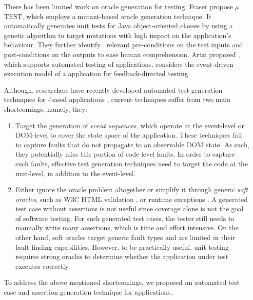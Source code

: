 There has been limited work on oracle generation for testing. 
Fraser \etal \cite{fraser:tse12} propose $\mu$TE\-ST, which employs a mutant-based oracle generation technique.  It automatically generates unit tests for Java object-oriented classes by using a genetic algorithm to target mutations with high impact on the application's behaviour. They further identify~\cite{fraser:issta11} relevant pre-conditions on the test inputs and post-conditions on the outputs to ease human comprehension.
Artzi \etal proposed \artemis \cite{artzi:icse11}, which supports automated testing of \javascript applications.
\artemis considers the event-driven execution model of a \javascript application for feedback-directed testing. 

 Although, researchers have recently developed automated test generation techniques for \javascript-based applications \cite{artzi:icse11, marchetto:search, tonella:icst08, mesbah:tse12, song:symb10}, current techniques suffer from two main shortcomings, namely, they:
\begin{enumerate} 
\item Target the generation of \emph{event sequences}, which operate at the event-level or DOM-level to cover the state space of the application. These techniques fail to capture faults that  do not propagate to an observable DOM state. As such, they potentially miss this portion of code-level \javascript faults. In order to capture such faults, effective test generation techniques need to target the code at the \javascript unit-level, in addition to the event-level.
\item Either ignore the oracle problem altogether or simplify it through generic \emph{soft oracles}, such as  W3C HTML  validation \cite{artzi:icse11,mesbah:tse12}, or  \javascript runtime exceptions \cite{artzi:icse11}.
A generated test case without assertions is not useful since coverage alone is not the goal of software testing. For such generated test cases, the tester still needs to  manually write many assertions, which is time and effort intensive. 
On the other hand, soft oracles  target generic fault types and are limited in their fault finding capabilities.   %
However, to be practically useful, unit testing requires strong oracles to determine whether the application under test executes correctly.
\end{enumerate}
To address the above mentioned shortcomings, we proposed an automated test case and assertion generation technique for \javascript applications.

